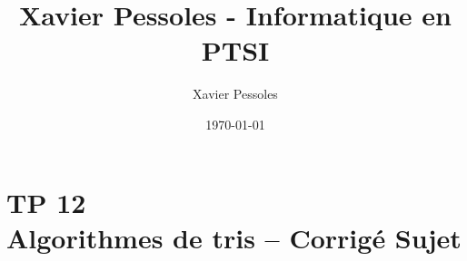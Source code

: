 \documentclass[
	fontsize=10pt, %
	twoside=true, %
]{kaobook}
\newcommand{\repRel}{../../..}
\newcommand{\repStyle}{\repRel/Style}
\begin{document}

\titlehead{Xavier Pessoles - Informatique en PTSI}
\title[Xavier Pessoles - Informatique en PTSI]{Xavier Pessoles - Informatique en PTSI}
\author[XP]{Xavier Pessoles}
\date{\today}


\begingroup %
\endgroup

%
\mainmatter %
%
%
%
%


\setcounter{margintocdepth}{\sectiontocdepth}
\marginlayout
\graphicspath{{\repStyle/png}}

\pagestyle{xp.scrheadings}


%



\newcommand{\repExo}{}
\newcommand{\nomExo}{}

\livrettrue %
\livrettrue
\colletrue








\chapter*{TP 12 \\ 
Algorithmes de tris -- \ifprof Corrigé \else Sujet \fi}
\end{document}
